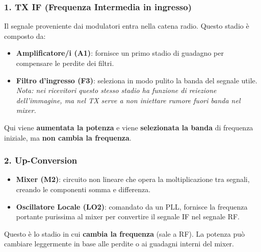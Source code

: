 \documentclass[openany,a4paper,12pt]{book}
\begin{document}
\subsubsection*{1. TX IF (Frequenza Intermedia in ingresso)}
Il segnale proveniente dai modulatori entra nella catena radio. Questo stadio è composto da:
\begin{itemize}[label=\textcolor{PoliBlue}{\textbullet}]
    \item \textbf{Amplificatore/i (A1)}: fornisce un primo stadio di guadagno per compensare le perdite dei filtri.
    \item \textbf{Filtro d'ingresso (F3)}: seleziona in modo pulito la banda del segnale utile. \textit{Nota: nei ricevitori questo stesso stadio ha funzione di reiezione dell'immagine, ma nel TX serve a non iniettare rumore fuori banda nel mixer.}
\end{itemize}
\begin{nota}[colback=PoliBlue!5, colframe=PoliBlue, title={\textbf{Cosa succede nello stadio TX IF?}}]
    Qui viene \textbf{aumentata la potenza} e viene \textbf{selezionata la banda} di frequenza iniziale, ma \textbf{non cambia la frequenza}.
\end{nota}

\subsubsection*{2. Up-Conversion}
\begin{itemize}[label=\textcolor{OpticRed}{\textbullet}]
    \item \textbf{Mixer (M2)}: circuito non lineare che opera la moltiplicazione tra segnali, creando le componenti somma e differenza.
    \item \textbf{Oscillatore Locale (LO2)}: comandato da un PLL, fornisce la frequenza portante purissima al mixer per convertire il segnale IF nel segnale RF.
\end{itemize}
\begin{nota}[colback=OpticRed!5, colframe=OpticRed, title={\textbf{Cosa succede nell'Up-Conversion?}}]
    Questo è lo stadio in cui \textbf{cambia la frequenza} (sale a RF). La potenza può cambiare leggermente in base alle perdite o ai guadagni interni del mixer.
\end{nota}
\end{document}
